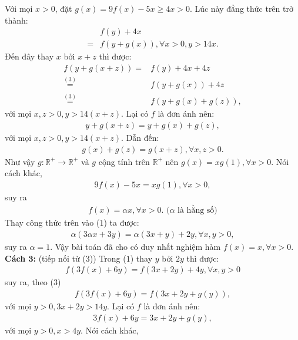 \begin{multicols}{2}
	\vskip 0.1cm
	Với mọi  $x > 0$, đặt  $g(x) = 9f(x) - 5x \ge 4x > 0.$ Lúc này đẳng thức trên trở thành: 
	\begin{align*}
		&f(y) + 4x \\
		= &f(y + g(x)),\forall x > 0,y > 14x. \tag{$3$}
	\end{align*}
	Đến đây thay $x$  bởi $x + z$  thì được: 
	\begin{align*}
		f(y + g(x + z))
		= &f(y) + 4x + 4z\\
		\mathop  = \limits^{(3)} &f(y + g(x)) + 4z\\
		\mathop  = \limits^{(3)} &f(y \!+\! g(x) \!+\! g(z)),
	\end{align*}
	với mọi $ x,z > 0,y > 14(x + z)$.
	Lại có $f$ là đơn ánh nên: 
	\begin{align*}
		y + g(x + z) = y + g(x) + g(z),
	\end{align*}
	với mọi $x,z > 0,y > 14(x + z).$ Dẫn đến: 
	\begin{align*}
		g(x) + g(z) = g(x + z),\forall x,z > 0.
	\end{align*}
	Như vậy $g: \mathbb{R^+} \to \mathbb{R^+}$  và $g$ cộng tính trên $\mathbb{R^+}$  nên $g(x) = xg(1),\forall x > 0.$  Nói cách khác, 
	\begin{align*}
		9f(x) - 5x = xg(1),\forall x > 0,
	\end{align*}
	suy ra
	\begin{align*}
		f(x) = \alpha x,\forall x > 0. \text{ ($\alpha$ là hằng số)}
	\end{align*}
	Thay công thức trên vào ($1$) ta được: 
	\begin{align*}
		\alpha (3\alpha x + 3y) = \alpha (3x + y) + 2y,\forall x,y > 0,
	\end{align*}
	suy ra $\alpha = 1.$
	Vậy bài toán đã cho có duy nhất nghiệm hàm  $f(x)= x, \forall x > 0$.
	\vskip 0.1cm
	\textbf{\color{hoccungpi}Cách $\pmb3$:} (tiếp nối từ ($3$))
	\vskip 0.1cm 
	Trong ($1$) thay $y$ bởi $2y$ thì được: 
	\begin{align*}
		f(3f(x) \!+\! 6y) \!=\! f(3x \!+\! 2y) \!+\! 4y,\forall x,y > 0
	\end{align*}
	suy ra, theo ($3$)
	\begin{align*}
		f(3f(x) + 6y) = f(3x + 2y + g(y)),
	\end{align*}
	với mọi $y > 0,3x + 2y > 14y.$ 
	\vskip 0.1cm
	Lại có  $f$ là đơn ánh nên: 
	\begin{align*}
		3f(x) + 6y = 3x + 2y + g(y),
	\end{align*}
	với mọi $y > 0,x > 4y.$
	Nói cách khác, 

\end{multicols}
